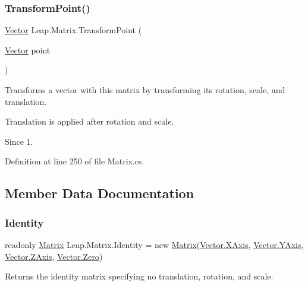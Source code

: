 \subsubsection{\texorpdfstring{TransformPoint()}{TransformPoint()}}
{\footnotesize\ttfamily \mbox{\hyperlink{struct_leap_1_1_vector}{Vector}} Leap.\+Matrix.\+Transform\+Point (\begin{DoxyParamCaption}\item[{\mbox{\hyperlink{struct_leap_1_1_vector}{Vector}}}]{point }\end{DoxyParamCaption})}



Transforms a vector with this matrix by transforming its rotation, scale, and translation. 

Translation is applied after rotation and scale.

\begin{DoxySince}{Since}
1. 
\end{DoxySince}


Definition at line 250 of file Matrix.\+cs.



\subsection{Member Data Documentation}
\mbox{\label{struct_leap_1_1_matrix_a54d2973a3dbf9699e9638f504768c81f}} 
\subsubsection{\texorpdfstring{Identity}{Identity}}
{\footnotesize\ttfamily readonly \mbox{\hyperlink{struct_leap_1_1_matrix}{Matrix}} Leap.\+Matrix.\+Identity = new \mbox{\hyperlink{struct_leap_1_1_matrix}{Matrix}}(\mbox{\hyperlink{struct_leap_1_1_vector_ad62a202318bf591b431928859449b19c}{Vector.\+X\+Axis}}, \mbox{\hyperlink{struct_leap_1_1_vector_abf07de0f419b3de5776e046d35c0843e}{Vector.\+Y\+Axis}}, \mbox{\hyperlink{struct_leap_1_1_vector_a2b2f1a3a9334e812e832e3b1b6cd4384}{Vector.\+Z\+Axis}}, \mbox{\hyperlink{struct_leap_1_1_vector_a007c4ee68aa890118b7a2d24aa4d9a6b}{Vector.\+Zero}})\hspace{0.3cm}{\ttfamily [static]}}



Returns the identity matrix specifying no translation, rotation, and scale. 

